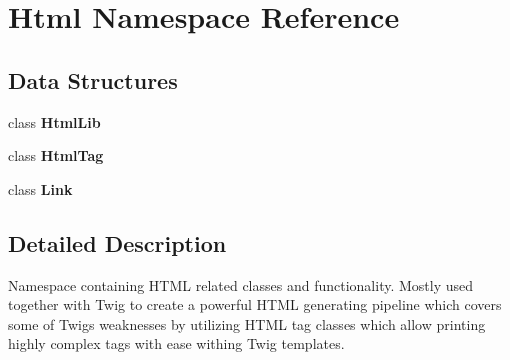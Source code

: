 \section{Html Namespace Reference}
\label{namespace_html}
\subsection*{Data Structures}
\begin{DoxyCompactItemize}
\item 
class \textbf{ Html\+Lib}
\item 
class \textbf{ Html\+Tag}
\item 
class \textbf{ Link}
\end{DoxyCompactItemize}


\subsection{Detailed Description}
Namespace containing H\+T\+ML related classes and functionality. Mostly used together with Twig to create a powerful H\+T\+ML generating pipeline which covers some of Twigs weaknesses by utilizing H\+T\+ML tag classes which allow printing highly complex tags with ease withing Twig templates. 